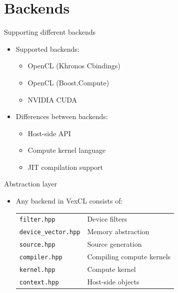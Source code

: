 \documentclass[@BEAMER_OPTIONS@]{beamer}
\newcommand{\CXX}{{\rm C}\plusplus}
\begin{document}
\note{}

\section{Backends}

\begin{frame}{Supporting different backends}
    \begin{itemize}
        \item Supported backends:
            \begin{itemize}
                \item OpenCL (Khronos \CXX bindings)
                \item OpenCL (Boost.Compute)
                \item NVIDIA CUDA
            \end{itemize}
            \vspace{\baselineskip}

        \item Differences between backends:
            \begin{itemize}
                \item Host-side API
                \item Compute kernel language
                \item JIT compilation support
            \end{itemize}
    \end{itemize}
\end{frame}

\begin{frame}[fragile]{Abstraction layer}
    \begin{itemize}
        \item Any backend in VexCL consists of:
            \vspace{0.5\baselineskip}

            \begin{tabular}{ll}
                \verb|filter.hpp|        & Device filters            \\
                \verb|device_vector.hpp| & Memory abstraction        \\
                \verb|source.hpp|        & Source generation         \\
                \verb|compiler.hpp|      & Compiling compute kernels \\
                \verb|kernel.hpp|        & Compute kernel            \\
                \verb|context.hpp|       & Host-side objects         \\
            \end{tabular}
    \end{itemize}
\end{frame}
\end{document}
